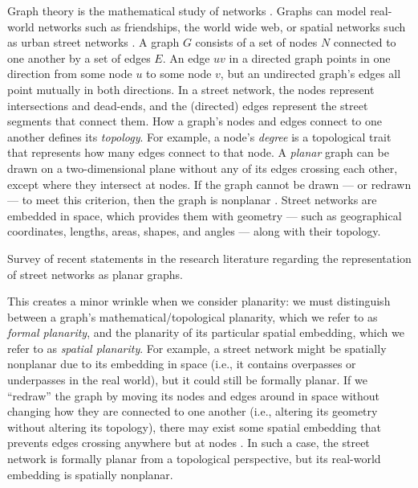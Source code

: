 \documentclass[Afour,sageh,times]{sagej}
\begin{document}
Graph theory is the mathematical study of networks \citep{newman_networks:_2010}. Graphs can model real-world networks such as friendships, the world wide web, or spatial networks such as urban street networks \citep{barthelemy_spatial_2011}. A graph $G$ consists of a set of nodes $N$ connected to one another by a set of edges $E$. An edge $uv$ in a directed graph points in one direction from some node $u$ to some node $v$, but an undirected graph's edges all point mutually in both directions. In a street network, the nodes represent intersections and dead-ends, and the (directed) edges represent the street segments that connect them. How a graph's nodes and edges connect to one another defines its \emph{topology}. For example, a node's \emph{degree} is a topological trait that represents how many edges connect to that node. A \emph{planar} graph can be drawn on a two-dimensional plane without any of its edges crossing each other, except where they intersect at nodes. If the graph cannot be drawn --- or redrawn --- to meet this criterion, then the graph is nonplanar \citep{trudeau_introduction_1994}. Street networks are embedded in space, which provides them with geometry --- such as geographical coordinates, lengths, areas, shapes, and angles --- along with their topology.

\begin{table}[htbp]
\centering
\caption{Survey of recent statements in the research literature regarding the representation of street networks as planar graphs.}
\label{tab:planar_quotes}

\end{table}

This creates a minor wrinkle when we consider planarity: we must distinguish between a graph's mathematical/topological planarity, which we refer to as \emph{formal planarity}, and the planarity of its particular spatial embedding, which we refer to as \emph{spatial planarity}. For example, a street network might be spatially nonplanar due to its embedding in space (i.e., it contains overpasses or underpasses in the real world), but it could still be formally planar. If we \enquote{redraw} the graph by moving its nodes and edges around in space without changing how they are connected to one another (i.e., altering its geometry without altering its topology), there may exist some spatial embedding that prevents edges crossing anywhere but at nodes \citep[p.~6]{barthelemy_morphogenesis_2017}. In such a case, the street network is formally planar from a topological perspective, but its real-world embedding is spatially nonplanar.
\end{document}
